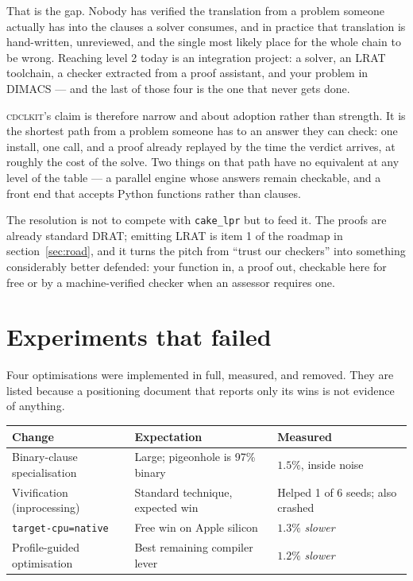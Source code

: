 \documentclass[11pt,a4paper]{article}
\newcommand{\cdclkit}{\textsc{cdclkit}}
\begin{document}
That is the gap. Nobody has verified the translation from a problem someone
actually has into the clauses a solver consumes, and in practice that
translation is hand-written, unreviewed, and the single most likely place for
the whole chain to be wrong. Reaching level 2 today is an integration project:
a solver, an LRAT toolchain, a checker extracted from a proof assistant, and
your problem in DIMACS --- and the last of those four is the one that never
gets done.

\cdclkit{}'s claim is therefore narrow and about adoption rather than strength.
It is the shortest path from a problem someone has to an answer they can check:
one install, one call, and a proof already replayed by the time the verdict
arrives, at roughly the cost of the solve. Two things on that path have no
equivalent at any level of the table --- a parallel engine whose answers remain
checkable, and a front end that accepts Python functions rather than clauses.

The resolution is not to compete with \texttt{cake\_lpr} but to feed it. The
proofs are already standard DRAT; emitting LRAT is item 1 of the roadmap in
section~\ref{sec:road}, and it turns the pitch from ``trust our checkers'' into
something considerably better defended: your function in, a proof out,
checkable here for free or by a machine-verified checker when an assessor
requires one.

\section{Experiments that failed}
\label{sec:failed}

Four optimisations were implemented in full, measured, and removed. They are
listed because a positioning document that reports only its wins is not
evidence of anything.

\begin{table}[h]
\centering
\begin{tabular}{p{4.4cm}p{5.2cm}p{4.6cm}}
\toprule
Change & Expectation & Measured \\
\midrule
Binary-clause specialisation & Large; pigeonhole is 97\% binary
  & $1.5\%$, inside noise \\
Vivification (inprocessing) & Standard technique, expected win
  & Helped 1 of 6 seeds; also crashed \\
\texttt{target-cpu=native} & Free win on Apple silicon & $1.3\%$
  \emph{slower} \\
Profile-guided optimisation & Best remaining compiler lever & $1.2\%$
  \emph{slower} \\
\bottomrule
\end{tabular}
\end{table}
\end{document}
